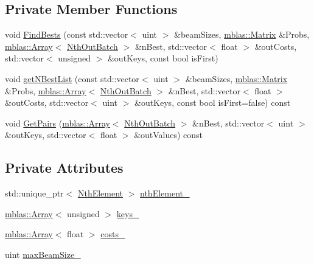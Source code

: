 \subsection*{Private Member Functions}
\begin{DoxyCompactItemize}
\item 
void \hyperlink{classamunmt_1_1GPU_1_1BestHyps_a5da6d49b0626b8935bafcd8666f5f9c0}{Find\+Bests} (const std\+::vector$<$ uint $>$ \&beam\+Sizes, \hyperlink{namespaceamunmt_1_1GPU_1_1mblas_ab67821a8254de53e45a623cf73c0aef6}{mblas\+::\+Matrix} \&Probs, \hyperlink{classamunmt_1_1GPU_1_1mblas_1_1Array}{mblas\+::\+Array}$<$ \hyperlink{structamunmt_1_1GPU_1_1NthOutBatch}{Nth\+Out\+Batch} $>$ \&n\+Best, std\+::vector$<$ float $>$ \&out\+Costs, std\+::vector$<$ unsigned $>$ \&out\+Keys, const bool is\+First)
\item 
void \hyperlink{classamunmt_1_1GPU_1_1BestHyps_a9faea39d64a777b66e524190e8dc57ae}{get\+N\+Best\+List} (const std\+::vector$<$ uint $>$ \&beam\+Sizes, \hyperlink{namespaceamunmt_1_1GPU_1_1mblas_ab67821a8254de53e45a623cf73c0aef6}{mblas\+::\+Matrix} \&Probs, \hyperlink{classamunmt_1_1GPU_1_1mblas_1_1Array}{mblas\+::\+Array}$<$ \hyperlink{structamunmt_1_1GPU_1_1NthOutBatch}{Nth\+Out\+Batch} $>$ \&n\+Best, std\+::vector$<$ float $>$ \&out\+Costs, std\+::vector$<$ uint $>$ \&out\+Keys, const bool is\+First=false) const 
\item 
void \hyperlink{classamunmt_1_1GPU_1_1BestHyps_a19a16e9b1c3bb808eed3014058e2bad8}{Get\+Pairs} (\hyperlink{classamunmt_1_1GPU_1_1mblas_1_1Array}{mblas\+::\+Array}$<$ \hyperlink{structamunmt_1_1GPU_1_1NthOutBatch}{Nth\+Out\+Batch} $>$ \&n\+Best, std\+::vector$<$ uint $>$ \&out\+Keys, std\+::vector$<$ float $>$ \&out\+Values) const 
\end{DoxyCompactItemize}
\subsection*{Private Attributes}
\begin{DoxyCompactItemize}
\item 
std\+::unique\+\_\+ptr$<$ \hyperlink{classamunmt_1_1GPU_1_1NthElement}{Nth\+Element} $>$ \hyperlink{classamunmt_1_1GPU_1_1BestHyps_a995703d0b8ddcbf445d59c6b20b794b7}{nth\+Element\+\_\+}
\item 
\hyperlink{classamunmt_1_1GPU_1_1mblas_1_1Array}{mblas\+::\+Array}$<$ unsigned $>$ \hyperlink{classamunmt_1_1GPU_1_1BestHyps_a0208d7c0fa0130e0466f4180c6a691e8}{keys\+\_\+}
\item 
\hyperlink{classamunmt_1_1GPU_1_1mblas_1_1Array}{mblas\+::\+Array}$<$ float $>$ \hyperlink{classamunmt_1_1GPU_1_1BestHyps_a6e995c778cdfdd7fcec7ed83fa66e0f7}{costs\+\_\+}
\item 
uint \hyperlink{classamunmt_1_1GPU_1_1BestHyps_a76edd802101677a575af499aab958722}{max\+Beam\+Size\+\_\+}
\end{DoxyCompactItemize}
